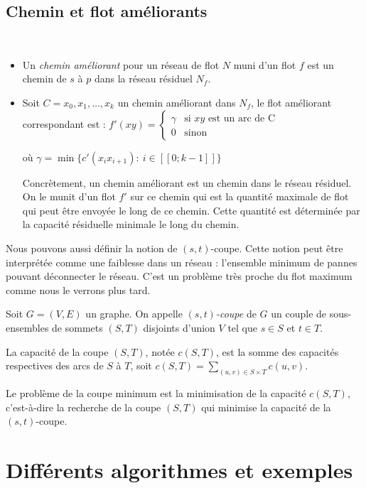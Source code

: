 \documentclass[a4paper]{article}
\begin{document}
\subsection{Chemin et flot améliorants}
\begin{definition}\,
\begin{itemize}
	\item
    Un \emph{chemin améliorant} pour un réseau de flot $N$ muni d'un flot $f$ est un chemin de $s$ à $p$ dans la réseau résiduel $N_f$.
    \item
    Soit $C = x_0,x_1,\ldots,x_k$ un chemin améliorant dans $N_f$, le flot améliorant correspondant est :
$f'(xy) = \left\{
    \begin{array}{ll}
        \gamma & \mbox{si } xy \mbox{ est un arc de C} \\
        0 & \mbox{sinon}
    \end{array}
\right.$

où $\gamma = \min \{c'(x_ix_{i+1}):\: i \in [\![0;k-1]\!]\}$

Concrètement, un chemin améliorant est un chemin dans le réseau résiduel. On le munit d'un flot $f'$ sur ce chemin qui est la quantité maximale de flot qui peut être envoyée le long de ce chemin. Cette quantité est déterminée par la capacité résiduelle minimale le long du chemin.
\end{itemize}
\end{definition}
Nous pouvons aussi définir la notion de $(s, t)$-coupe. Cette notion peut être interprétée comme une faiblesse dans un réseau : l'ensemble minimum de pannes pouvant déconnecter le réseau. C'est un problème très proche du flot maximum comme nous le verrons plus tard.
\begin{definition}[$(s, t)$-coupe]
	Soit $G = (V, E)$ un graphe. On appelle \emph{$(s, t)$-coupe} de $G$ un couple de sous-ensembles de sommets $(S, T)$ disjoints d'union $V$ tel que $s \in S$ et $t \in T$.

	La capacité de la coupe $(S, T)$, notée $c(S, T)$, est la somme des capacités respectives des arcs de $S$ à $T$, soit $c(S, T) = \displaystyle\sum_{(u, v) \in S \times T} c(u, v)$.
\end{definition}
Le problème de la coupe minimum est la minimisation de la capacité $c(S, T)$, c'est-à-dire la recherche de la coupe $(S, T)$ qui minimise la capacité de la $(s, t)$-coupe.
\section{Différents algorithmes et exemples}
\label{sec:algos}
\end{document}
